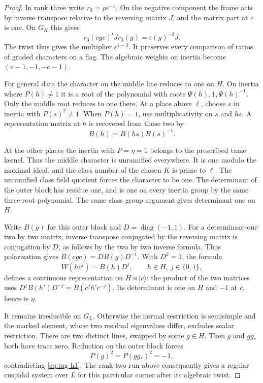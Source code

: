 \begin{proof}
In rank three write \(r_3=\rho\epsilon^{-1}\). On the negative
component the frame acts by inverse transpose relative to
the reversing matrix \(J\), and the matrix part at \(c\) is
one. On \(G_K\) this gives
\[
             r_3(cgc)^t J r_3(g)=\epsilon(g)^{-2}J .
\]
The twist thus gives the multiplier \(\epsilon^{1-3}\).
It preserves every comparison of ratios of graded
characters on a flag. The algebraic weights on inertia
become \((e-1,-1,-e-1)\).

For general data the character on the middle line reduces to
one on \(H\). On inertia where \(P(h)\ne1\) it is a root of
the polynomial with roots \(\Psi(h),1,\Psi(h)^{-1}\). Only
the middle root reduces to one there. At a place above
\(\ell\), choose \(s\) in inertia with \(P(s)^2\ne1\).
When \(P(h)=1\), use multiplicativity on \(s\) and \(hs\). A representation matrix at \(h\) is recovered from those two by
\[
 B(h)=B(hs)B(s)^{-1} .
\]

At the other places
the inertia with \(P=\eta=1\) belongs to the prescribed tame
kernel. Thus the middle character is unramified everywhere.
It is one modulo the maximal ideal, and the class number
of the chosen \(K\) is prime to \(\ell\). The unramified
class field quotient forces the character to be one. The
determinant of the outer block has residue one, and is one
on every inertia group by the same three-root polynomial.
The same class group argument gives determinant one on \(H\).

Write \(B(g)\) for this outer block and
\(D=\operatorname{diag}(-1,1)\). For a determinant-one
two by two matrix, inverse transpose conjugated by the
reversing matrix is conjugation by \(D\), as follows by
the two by two inverse formula. Thus polarization gives \(B(cgc)=D B(g)D^{-1}\).
With \(D^2=1\), the formula
\[
 W(hc^j)=B(h)D^j,\qquad
     h\in H,\ j\in\{0,1\},
\]
defines a continuous representation on \(H\rtimes\langle c\rangle\):
the product of the two matrices uses
\(D^j B(h') D^{-j}=B(c^jh'c^{-j})\).
Its determinant is one on \(H\) and \(-1\) at \(c\), hence is
\(\eta\).

It remains irreducible on \(G_L\). Otherwise the
normal restriction is semisimple and the marked element,
whose two residual eigenvalues differ, excludes scalar
restriction. There are two distinct lines, swapped by
some \(g\in H\). Then \(g\) and \(gg_*\) both have trace
zero. Reduction on the outer block forces
\[
 P(g)^2=P(gg_*)^2=-1,
\]
contradicting \eqref{eq:tag-h1}.
The rank-two run above consequently gives a regular
cuspidal system over \(L\) for this particular corner
after its algebraic twist.


\end{proof}
